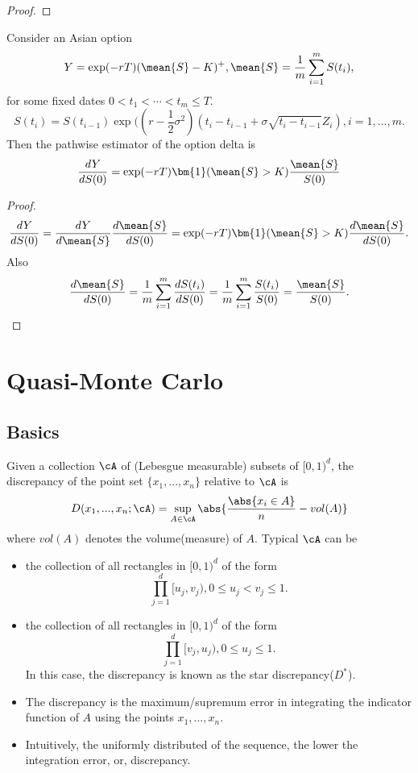 \begin{refsection}
\begin{proof}
\end{proof}

\begin{lemma}\cite[389]{glasserman2003monte}
	Consider an Asian option 
	$$Y = \exp(-rT)(\mean{S} - K)^+, \mean{S} = \frac{1}{m}\sum_{i=1}^m S(t_i),$$
	for some fixed dates $0 < t_1 < \cdots < t_m \leq T$.
	$$S(t_i) = S(t_{i-1})\exp((r-\frac{1}{2}\sigma^2)(t_i - t_{i-1} + \sigma \sqrt{t_i - t_{i-1}}Z_i), i = 1,...,m.$$
	Then the pathwise estimator of the option delta is
	$$\frac{dY}{dS(0)} = \exp(-rT)\bm{1}(\mean{S}>K)\frac{\mean{S}}{S(0)}$$	
\end{lemma}
\begin{proof}
	$$\frac{dY}{dS(0)} = \frac{dY}{d\mean{S}}\frac{d\mean{S}}{dS(0)} = \exp(-rT)\bm{1}(\mean{S}>K)\frac{d\mean{S}}{dS(0)}.$$
	Also
	$$\frac{d\mean{S}}{dS(0)} = \frac{1}{m}\sum_{i=1}^m \frac{dS(t_i)}{dS(0)} = \frac{1}{m}\sum_{i=1}^m \frac{S(t_i)}{S(0)} = \frac{\mean{S}}{S(0)}.$$
	
\end{proof}
\section{Quasi-Monte Carlo}
\subsection{Basics}
\begin{definition}[discrepancy]\cite[283]{glasserman2003monte} Given a collection $\cA$ of (Lebesgue measurable) subsets of $[0,1)^d$, the discrepancy of the point set $\{x_1,...,x_n\}$ relative to $\cA$ is
	$$D(x_1,...,x_n;\cA) = \sup_{A\in \cA} \abs{\frac{\abs{x_i\in A}}{n} - vol(A)}$$
	where $vol(A)$ denotes the volume(measure) of $A$. 
	Typical $\cA$ can be
	\begin{itemize}
		\item the collection of all rectangles in $[0,1)^d$ of the form 
		$$\prod_{j=1}^d [u_j,v_j), 0 \leq u_j < v_j \leq 1.$$
		\item the collection of all rectangles in $[0,1)^d$ of the form 
		$$\prod_{j=1}^d [v_j,u_j), 0 \leq u_j \leq 1.$$
		In this case, the discrepancy is known as the star discrepancy($D^*$).
	\end{itemize}
\end{definition}

\begin{remark}[interpretation]\hfill
	\begin{itemize}
		\item The discrepancy is the maximum/supremum error in integrating the indicator function of $A$ using the points $x_1,...,x_n$.
		\item Intuitively, the uniformly distributed of the sequence, the lower the integration error, or, discrepancy.
	\end{itemize}	
\end{remark}




\end{refsection}
